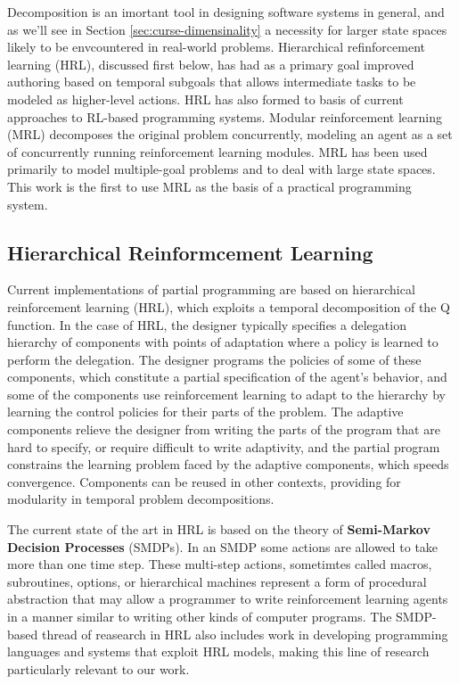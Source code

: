 Decomposition is an imortant tool in designing software systems in general, and as we'll see in Section \ref{sec:curse-dimensinality} a necessity for larger state spaces likely to be envcountered in real-world problems. Hierarchical refinforcement learning (HRL), discussed first below, has had as a primary goal improved authoring based on temporal subgoals that allows intermediate tasks to be modeled as higher-level actions. HRL has also formed to basis of current approaches to RL-based programming systems. Modular reinforcement learning (MRL) decomposes the original problem concurrently, modeling an agent as a set of concurrently running reinforcement learning modules. MRL has been used primarily to model multiple-goal problems and to deal with large state spaces. This work is the first to use MRL as the basis of a practical programming system.

\subsection{Hierarchical Reinformcement Learning}

Current implementations of partial programming are based on hierarchical reinforcement learning (HRL), which exploits a temporal decomposition of the Q function.  In the case of HRL, the designer typically specifies a delegation hierarchy of components with points of adaptation where a policy is learned to perform the delegation.  The designer programs the policies of some of these components, which constitute a partial specification of the agent's behavior, and some of the components use reinforcement learning to adapt to the hierarchy by learning the control policies for their parts of the problem.  The adaptive components relieve the designer from writing the parts of the program that are hard to specify, or require difficult to write adaptivity, and the partial program constrains the learning problem faced by the adaptive components, which speeds convergence.  Components can be reused in other contexts, providing for modularity in temporal problem decompositions.

The current state of the art in HRL is based on the theory of {\bf Semi-Markov Decision Processes} (SMDPs). In an SMDP some actions are allowed to take more than one time step. These multi-step actions, sometimtes called macros, subroutines, options, or hierarchical machines represent a form of procedural abstraction that may allow a programmer to write reinforcement learning agents in a manner similar to writing other kinds of computer programs. The SMDP-based thread of reasearch in HRL also includes work in developing programming languages and systems that exploit HRL models, making this line of research particularly relevant to our work.


